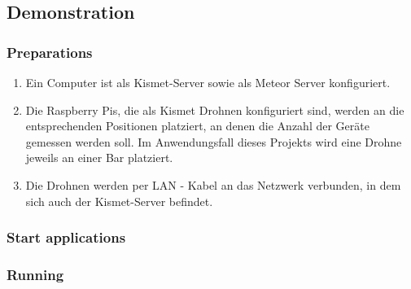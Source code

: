\documentclass[a4paper]{spie}  %
\begin{document}
\subsection{Demonstration}
\subsubsection{Preparations}
\begin{enumerate}
 \item Ein Computer ist als Kismet-Server sowie als Meteor Server konfiguriert.
 \item Die Raspberry Pis, die als Kismet Drohnen konfiguriert sind, werden an die entsprechenden Positionen platziert, an denen die Anzahl der Geräte gemessen werden soll. Im Anwendungsfall dieses Projekts wird eine Drohne jeweils an einer Bar platziert.
 \item Die Drohnen werden per LAN - Kabel an das Netzwerk verbunden, in dem sich auch der Kismet-Server befindet.
\end{enumerate}
\subsubsection{Start applications}


\subsubsection{Running}
\end{document}
